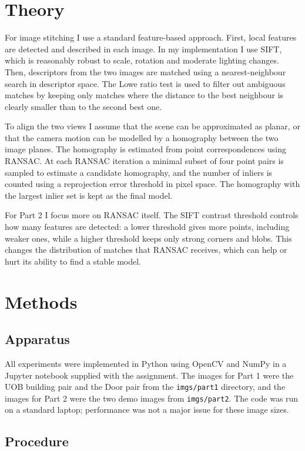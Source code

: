 \documentclass{Resources/UoBLab1}
\begin{document}
\section{Theory}

For image stitching I use a standard feature-based approach.
First, local features are detected and described in each image.
In my implementation I use SIFT, which is reasonably robust to scale, rotation and moderate lighting changes.
Then, descriptors from the two images are matched using a nearest-neighbour search in descriptor space.
The Lowe ratio test is used to filter out ambiguous matches by keeping only matches where the distance to the best neighbour is clearly smaller than to the second best one.

To align the two views I assume that the scene can be approximated as planar, or that the camera motion can be modelled by a homography between the two image planes.
The homography is estimated from point correspondences using RANSAC.
At each RANSAC iteration a minimal subset of four point pairs is sampled to estimate a candidate homography, and the number of inliers is counted using a reprojection error threshold in pixel space.
The homography with the largest inlier set is kept as the final model.

For Part 2 I focus more on RANSAC itself.
The SIFT contrast threshold controls how many features are detected: a lower threshold gives more points, including weaker ones, while a higher threshold keeps only strong corners and blobs.
This changes the distribution of matches that RANSAC receives, which can help or hurt its ability to find a stable model.

\section{Methods}

\subsection{Apparatus}

All experiments were implemented in Python using OpenCV and NumPy in a Jupyter notebook supplied with the assignment.
The images for Part 1 were the UOB building pair and the Door pair from the \texttt{imgs/part1} directory, and the images for Part 2 were the two demo images from \texttt{imgs/part2}.
The code was run on a standard laptop; performance was not a major issue for these image sizes.

\subsection{Procedure}
\end{document}
